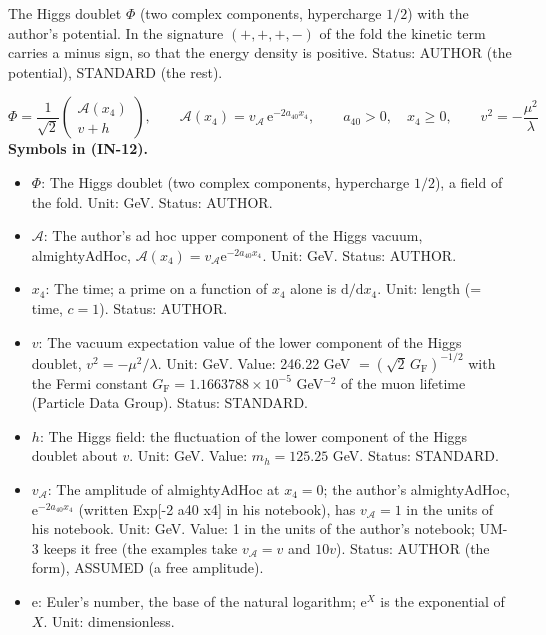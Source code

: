 \documentclass[
  10pt,
]{article}
\providecommand{\tightlist}{%
  \setlength{\itemsep}{0pt}\setlength{\parskip}{0pt}}
\begin{document}
The Higgs doublet \(\Phi\) (two complex components, hypercharge \(1/2\))
with the author's potential. In the signature \((+,+,+,-)\) of the fold
the kinetic term carries a minus sign, so that the energy density is
positive. Status: AUTHOR (the potential), STANDARD (the rest).

\[
\Phi = \frac{1}{\sqrt2}\begin{pmatrix}\mathcal{A}(x_4)\\ v + h\end{pmatrix},\qquad
\mathcal{A}(x_4) = v_{\mathcal{A}}\,\mathrm{e}^{-2a_{40}x_4},\qquad a_{40} > 0,\quad x_4 \ge 0,\qquad v^2 = -\frac{\mu^2}{\lambda} \tag{IN-12}
\] \textbf{Symbols in (IN-12).}

\begin{itemize}
\tightlist
\item
  \(\Phi\): The Higgs doublet (two complex components, hypercharge
  \(1/2\)), a field of the fold. Unit: GeV. Status: AUTHOR.
\item
  \(\mathcal{A}\): The author's ad hoc upper component of the Higgs
  vacuum, almightyAdHoc,
  \(\mathcal{A}(x_4) = v_{\mathcal{A}}\mathrm{e}^{-2a_{40}x_4}\). Unit:
  GeV. Status: AUTHOR.
\item
  \(x_4\): The time; a prime on a function of \(x_4\) alone is
  \(\mathrm{d}/\mathrm{d}x_4\). Unit: length (= time, \(c = 1\)).
  Status: AUTHOR.
\item
  \(v\): The vacuum expectation value of the lower component of the
  Higgs doublet, \(v^2 = -\mu^2/\lambda\). Unit: GeV. Value: 246.22 GeV
  \(= (\sqrt2\,G_{\mathrm{F}})^{-1/2}\) with the Fermi constant
  \(G_{\mathrm{F}} = 1.1663788\times10^{-5}\) GeV\(^{-2}\) of the muon
  lifetime (Particle Data Group). Status: STANDARD.
\item
  \(h\): The Higgs field: the fluctuation of the lower component of the
  Higgs doublet about \(v\). Unit: GeV. Value: \(m_h = 125.25\) GeV.
  Status: STANDARD.
\item
  \(v_{\mathcal{A}}\): The amplitude of almightyAdHoc at \(x_4 = 0\);
  the author's almightyAdHoc, \(\mathrm{e}^{-2a_{40}x_4}\) (written
  Exp{[}-2 a40 x4{]} in his notebook), has \(v_{\mathcal{A}} = 1\) in
  the units of his notebook. Unit: GeV. Value: 1 in the units of the
  author's notebook; UM-3 keeps it free (the examples take
  \(v_{\mathcal{A}} = v\) and \(10v\)). Status: AUTHOR (the form),
  ASSUMED (a free amplitude).
\item
  \(\mathrm{e}\): Euler's number, the base of the natural logarithm;
  \(\mathrm{e}^{X}\) is the exponential of \(X\). Unit: dimensionless.

\end{itemize}
\end{document}
